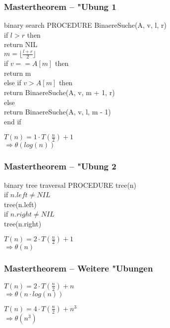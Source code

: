 \documentclass{beamer}
\begin{document}
\begin{frame}
\frametitle{Mastertheorem -- "Ubung 1}
\begin{exampleblock}{binary search}
PROCEDURE BinaereSuche(A, v, l, r)\\
if $l > r$ then\\
\hspace{1cm}return NIL\\
$m = \lfloor\frac{l + r}{2}\rfloor$\\
if $v == A[m]$ then\\
\hspace{1cm}return m\\
else if $v > A[m]$ then\\
\hspace{1cm}return BinaereSuche(A, v, m + 1, r)\\
else\\
\hspace{1cm}return BinaereSuche(A, v, l, m - 1)\\
end if
\end{exampleblock}

\pause

\begin{block}{}
$T(n) = 1 \cdot T\left(\frac{n}{2}\right) + 1$\pause\\
$\Longrightarrow \theta(log(n))$
\end{block}
\end{frame}


\begin{frame}
\frametitle{Mastertheorem -- "Ubung 2}
\begin{exampleblock}{binary tree traversal}
PROCEDURE tree(n)\\
if $n.left \not= NIL$\\
\hspace{1cm}tree(n.left)\\
if $n.right \not= NIL$\\
\hspace{1cm}tree(n.right)
\end{exampleblock}

\pause

\begin{block}{}
$T(n) = 2 \cdot T\left(\frac{n}{2}\right) + 1$\pause\\
$\Longrightarrow \theta(n)$
\end{block}
\end{frame}


\begin{frame}
\frametitle{Mastertheorem -- Weitere "Ubungen}
\begin{block}{}
$T(n) = 2 \cdot T\left(\frac{n}{2}\right) + n$\pause\\
$\Longrightarrow \theta(n \cdot log(n))$
\end{block}

\pause

\begin{block}{}
$T(n) = 4 \cdot T\left(\frac{n}{2}\right) + n^3$\pause\\
$\Longrightarrow \theta(n^3)$
\end{block}
\end{frame}
\end{document}
